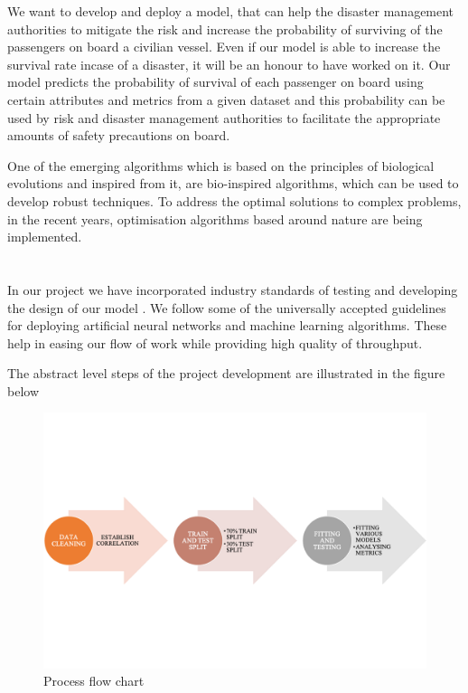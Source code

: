 \documentclass[12pt]{article}
\newcommand{\nd}{\noindent}
\newcommand{\secsize}{\fontsize{15pt}{12pt}\selectfont}
\begin{document}
\nd We want to develop and deploy a model, that can help the disaster management authorities to mitigate the risk and increase the probability of surviving of the passengers on board a civilian vessel. Even if our model is able to increase the survival rate incase of a disaster, it will be an honour to have worked on it. Our model predicts the probability of survival of each passenger on board using certain attributes and metrics from a given dataset and this probability can be used by risk and disaster management authorities to facilitate the appropriate amounts of safety precautions on board.

\nd One of the emerging algorithms which is based on the principles of biological evolutions and inspired from it, are bio-inspired algorithms, which can be used to develop robust techniques. To address the optimal solutions to complex problems, in the recent years, optimisation algorithms based around nature are being implemented. 

\newpage 
\section{\textbf{\secsize{System Methodology}}}
In our project we have incorporated industry standards of testing and developing the design of our model . We follow some of the universally accepted guidelines for deploying artificial neural networks and machine learning algorithms. These help in easing our flow of work while providing high quality of throughput.

\nd The abstract level steps of the project development are illustrated in the figure below 

\begin{center}
\begin{figure}[h]
\centerline{\includegraphics[scale=.6]{flow.png}}
\caption{Process flow chart}
\end{figure}
\end{center}
\end{document}
